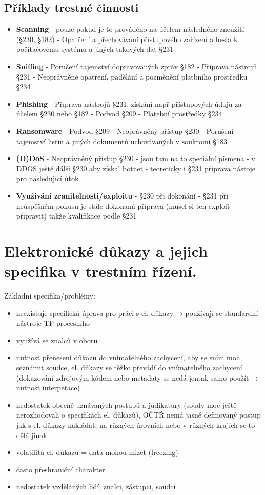 \subsection{Příklady trestné činnosti}
\begin{itemize}
    \item \textbf{Scanning} - pouze pokud je to prováděno na účelem následného zneužití (§230, §182) - Opatření a
přechovávání přístupového zařízení a hesla k počítačovému systému a jiných takových dat §231
    \item \textbf{Sniffing} - Poručení tajemství dopravovaných zpráv §182 - Příprava nástrojů §231 - Neoprávněné
opatření, padělání a pozměnění platbního prostředku §234
    \item \textbf{Phishing} - Příprava nástrojů §231, získání např přístupových údajů za účelem §230 nebo §182 -
Podvod §209 - Platební prostředky §234
    \item \textbf{Ransomware} - Podvod §209 - Neoprávněný přístup §230 - Porušení tajemství listin a jiných
dokumentů uchovávaných v soukromí §183
    \item \textbf{(D)DoS} - Neoprávněný přístup §230 - jsou tam na to speciální písmena - v DDOS ještě dálší §230
aby získal botnet - teoreticky i §231 příprava nástoje pro následující útok
    \item \textbf{Využivání zranitelnosti/exploitu} - §230 při dokonání - §231 při neúspěšném pokusu je stále
dokonaná příprava (musel si ten exploit připravit) takže kvalifikace podle §231
\end{itemize}


\newpage
\section{Elektronické důkazy a jejich specifika v trestním řízení.}
Základní specifika/problémy:
\begin{itemize}
    \item neexistuje specifická úprava pro práci s el. důkazy → používají se standardní nástroje TP procesního
    \item využívá se znalců v oboru
    \item nutnost přenesení důkazu do vnímatelného zachycení, aby se sním mohl seznámit soudce, el. důkazy se těžko převádí do vnímatelného zachycení (dokazování zdrojovým kódem nebo metadaty se nedá jentak samo použít → nutnost interpetace)
    \item nedostatek obecně uznávaných postupů a judikatury (soudy moc ještě nerozhodovali o specifikách el. důkazů), OČTŘ nemá jasně definovaný postup jak s el. důkazy nakládat, na různých úrovních nebo v různých krajích se to dělá jinak
    \item volatilita el. důkazů = data mohou mizet (freezing)
    \item často přeshraniční charakter
    \item nedostatek vzděláných lidí, znalci, zástupci, soudci 
\end{itemize}

